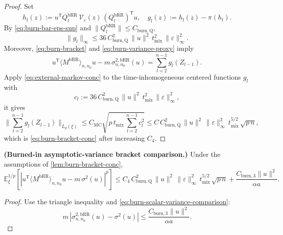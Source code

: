 \begin{proof} Set
\[
h_{l}(z) := u^{\mathsf{T}} Q_{l}^{\mathrm{bRR}} \, \mathcal{V}_{\varepsilon}(z)
  \, (Q_{l}^{\mathrm{bRR}})^{\mathsf{T}} u,
\quad
g_{l}(z) := h_{l}(z) - \pi(h_{l}).
\]
By \eqref{eq:burn-bar-eps-sup} and $\lVert Q_{l}^{\mathrm{bRR}} \rVert \le C_{\mathrm{burn,Q}}$,
\[
\lVert g_{l} \rVert_{\infty}
  \le 36 \, C_{\mathrm{burn,Q}}^{2} \, \lVert u \rVert^{2}
     \, t_{\mathrm{mix}}^{2} \, \lVert \varepsilon \rVert_{\infty}^{2}.
\]
Moreover, \eqref{eq:burn-bracket} and \eqref{eq:burn-variance-proxy} imply
\[
u^{\mathsf{T}} \langle M^{\mathrm{bRR}} \rangle_{n,n_{0}} u
  - m \, \sigma_{n,n_{0}}^{2, \mathrm{bRR}}(u)
  = \sum_{l = 2}^{n - 1} g_{l}(Z_{l - 1}).
\]
Apply \eqref{eq:external-markov-conc} to the time-inhomogeneous centered functions
$g_{l}$ with
\[
c_{l} := 36 \, C_{\mathrm{burn,Q}}^{2} \, \lVert u \rVert^{2}
  \, t_{\mathrm{mix}}^{2} \, \lVert \varepsilon \rVert_{\infty}^{2},
\]
it gives
\[
\lVert \sum_{l = 2}^{n - 1} g_{l}(Z_{l - 1}) \rVert_{L_{p}(\xi)}
  \le C_{\mathrm{MC}} \sqrt{p \, t_{\mathrm{mix}} \, \sum_{l = 2}^{n - 1} c_{l}^{2}}
  \le C \, C_{\mathrm{burn,Q}}^{2} \, \lVert u \rVert^{2}
     \, \lVert \varepsilon \rVert_{\infty}^{2} \, t_{\mathrm{mix}}^{5 / 2}
     \, \sqrt{p \, n},
\]
which is \eqref{eq:burn-bracket-conc} after increasing $C_{4}$. \end{proof}

\begin{corollary}\label{cor:burn-bracket-asymp}
  \textbf{(Burned-in asymptotic-variance bracket comparison.)}
  Under the assumptions of \cref{lem:burn-bracket-conc},
  \begin{equation}
\mathbb{E}_{\xi}^{1 / p} \left[ | u^{\mathsf{T}} \langle M^{\mathrm{bRR}} \rangle_{n,n_{0}} u
      - m \, \sigma^{2}(u) |^{p} \right]
    \le C_{4} \, C_{\mathrm{burn,Q}}^{2} \, \lVert u \rVert^{2}
       \, \lVert \varepsilon \rVert_{\infty}^{2} \, t_{\mathrm{mix}}^{5 / 2}
       \, \sqrt{p \, n}
       + \frac{C_{\mathrm{burn,3}} \lVert u \rVert^{2}}{\alpha a}.
\label{eq:burn-bracket-asymp}
\end{equation}
\end{corollary}

\begin{proof} Use the triangle inequality and \eqref{eq:burn-scalar-variance-comparison}:
\[
m \, |\sigma_{n,n_{0}}^{2, \mathrm{bRR}}(u) - \sigma^{2}(u)|
  \le \frac{C_{\mathrm{burn,3}} \lVert u \rVert^{2}}{\alpha a}.
\]
\end{proof}
